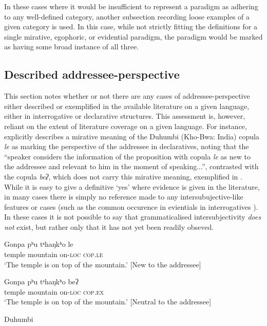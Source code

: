 In these cases where it would be insufficient to represent a paradigm as adhering to any well-defined category, another subsection recording loose examples of a given category is used. In this case, while not strictly fitting the definitions for a single mirative, egophoric, or evidential paradigm, the paradigm would be marked as having some broad instance of all three.

\subsection{Described addressee-perspective}
This section notes whether or not there are any cases of addressee-perspective either described or exemplified in the available literature on a given language, either in interrogative or declarative structures. This assessment is, however, reliant on the extent of literature coverage on a given language. For instance,  explicitly describes a mirative meaning of the Duhumbi (Kho-Bwa: India) copula \textit{le} as marking the perspective of the addressee in declaratives, noting that the ``speaker considers the information of the proposition with copula \textit{le} as new to the addressee and relevant to him in the moment of speaking...'', contrasted with the copula \textit{beʔ}, which does not carry this mirative meaning, exemplified in . While it is easy to give a definitive `yes' where evidence is given in the literature, in many cases there is simply no reference made to any intersubujective-like features or cases (such as the common occurence in evientials in interrogatives \cite{Aikhenvald2018Intro}). In these cases it is not possible to say that grammaticalised intersubjectivity \textit{does not} exist, but rather only that it has not yet been readily obseved.

\begin{exe}
\ex 
\begin{xlist}
\ex 
\gll Gonpa pʰu tᶝhaŋkʰo le \\
temple mountain on-\textsc{loc} \textsc{cop.le} \\
\glt `The temple is on top of the mountain.' [New to the addressee]

\ex 
\gll Gonpa pʰu tᶝhaŋkʰo beʔ \\
temple mountain on-\textsc{loc} \textsc{cop.ex} \\
\glt `The temple is on top of the mountain.' [Neutral to the addressee]
\end{xlist}
Duhumbi \cite[Kho-Bwa: India][408, notes on relation to addressee added by me]{Bodt2020}
\end{exe}

